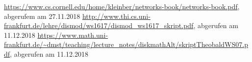 \documentclass[a4paper]{scrreprt}
\theoremstyle{plain} %
\theoremstyle{definition} %
\begin{document}

\begin{thebibliography}{2}
 \url{https://www.cs.cornell.edu/home/kleinber/networks-book/networks-book.pdf}, abgerufem am 27.11.2018
 \url{http://www.thi.cs.uni-frankfurt.de/lehre/dismod/ws1617/dismod_ws1617_skript.pdf}, abgerufen am 11.12.2018
 \url{https://www.math.uni-frankfurt.de/~dmst/teaching/lecture_notes/diskmathAlt/skriptTheobaldWS07.pdf}, abgerufen am 11.12.2018
\end{thebibliography}
\end{document}
